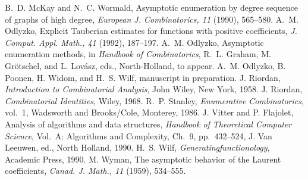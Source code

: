 \begin{thebibliography}{99}
B.~D. McKay and N.~C. Wormald,
Asymptotic enumeration by degree sequence of graphs of high degree,
{\em European J. Combinatorics, 11} (1990), 565--580.
A.~M. Odlyzko,
Explicit Tauberian estimates for functions with positive coefficients,
{\em J. Comput. Appl. Math., 41} (1992), 187--197.
A.~M. Odlyzko,
Asymptotic enumeration methods,
in {\em Handbook of Combinatorics}, R.~L. Graham,
M. Gr\"{o}tschel, and L. Lov\'{a}sz, eds., North-Holland, to appear.
A.~M. Odlyzko, B. Poonen, H. Widom, and H.~S. Wilf,
manuscript in preparation.
J. Riordan,
{\em Introduction to Combinatorial Analysis},
John Wiley, New York, 1958.
J. Riordan,
{\em Combinatorial Identities},
Wiley, 1968.
R.~P. Stanley,
{\em Enumerative Combinatorics}, vol.~1,
Wadsworth and Brooks/Cole, Monterey, 1986.
J. Vitter and P. Flajolet,
Analysis of algorithms and data structures,
{\em Handbook of Theoretical Computer Science},
Vol.~A: Algorithms and Complexity,
Ch.~9,
pp.~432--524,
J. Van Leeuwen, ed., North Holland, 1990.
H.~S. Wilf,
{\em Generatingfunctionology},
Academic Press, 1990.
M. Wyman,
The asymptotic behavior of the Laurent coefficients,
{\em Canad. J. Math., 11} (1959), 534--555.
\end{thebibliography}

